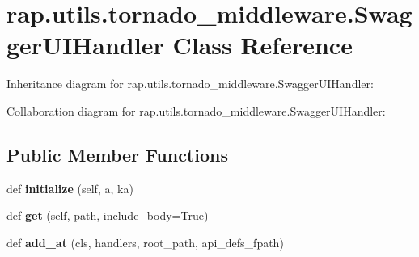 \hypertarget{classrap_1_1utils_1_1tornado__middleware_1_1SwaggerUIHandler}{}\section{rap.\+utils.\+tornado\+\_\+middleware.\+Swagger\+U\+I\+Handler Class Reference}
\label{classrap_1_1utils_1_1tornado__middleware_1_1SwaggerUIHandler}


Inheritance diagram for rap.\+utils.\+tornado\+\_\+middleware.\+Swagger\+U\+I\+Handler\+:


Collaboration diagram for rap.\+utils.\+tornado\+\_\+middleware.\+Swagger\+U\+I\+Handler\+:
\subsection*{Public Member Functions}
\begin{DoxyCompactItemize}
\item 
\mbox{\label{classrap_1_1utils_1_1tornado__middleware_1_1SwaggerUIHandler_a0451e9d0fc85a71bbb156576965fb7a3}} 
def {\bfseries initialize} (self, a, ka)
\item 
\mbox{\label{classrap_1_1utils_1_1tornado__middleware_1_1SwaggerUIHandler_ace33d7a1635db24c5f5884295b592ba7}} 
def {\bfseries get} (self, path, include\+\_\+body=True)
\item 
\mbox{\label{classrap_1_1utils_1_1tornado__middleware_1_1SwaggerUIHandler_a297cb7f42c661cd0afc9365055445845}} 
def {\bfseries add\+\_\+at} (cls, handlers, root\+\_\+path, api\+\_\+defs\+\_\+fpath)
\end{DoxyCompactItemize}
